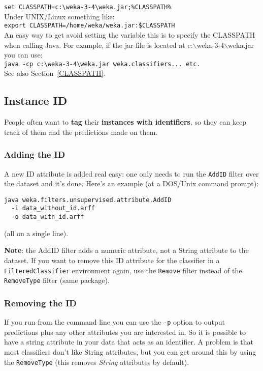 \verb^set CLASSPATH=c:\weka-3-4\weka.jar;%CLASSPATH%^\\

\noindent Under UNIX/Linux something like:\\

\verb^export CLASSPATH=/home/weka/weka.jar:$CLASSPATH^\\

\noindent An easy way to get avoid setting the variable this is to
specify the CLASSPATH when calling Java. For example, if the jar file
is located at c:$\backslash$weka-3-4$\backslash$weka.jar you can use:\\

\verb^java -cp c:\weka-3-4\weka.jar weka.classifiers... etc.^\\

\noindent See also Section~\ref{CLASSPATH}.

\subsection{Instance ID}
People often want to \textbf{tag} their \textbf{instances with
  identifiers}, so they can keep track of them and the predictions
made on them.

\subsubsection{Adding the ID}
A new ID attribute is added real easy: one only needs to run the \verb=AddID=
filter over the dataset and it's done. Here's an example (at a
DOS/Unix command prompt):\\

\begin{verbatim}
java weka.filters.unsupervised.attribute.AddID
  -i data_without_id.arff
  -o data_with_id.arff
\end{verbatim}

\noindent (all on a single line).

\textbf{Note}: the AddID filter adds a numeric attribute, not a String
attribute to the dataset. If you want to remove this ID attribute for
the classifier in a \verb=FilteredClassifier= environment again, use the
\verb=Remove= filter instead of the \verb=RemoveType= filter (same package).

\subsubsection{Removing the ID}
If you run from the command line you can use the \verb=-p= option to output
predictions plus any other attributes you are interested in. So it is
possible to have a string attribute in your data that acts as an
identifier. A problem is that most classifiers don't like String
attributes, but you can get around this by using the \verb=RemoveType= (this
removes \textit{String} attributes by default).

